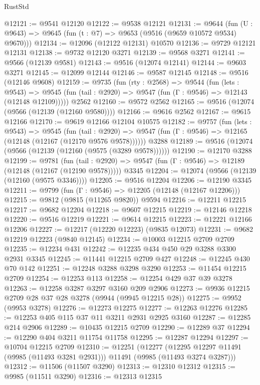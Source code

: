 \begin{lexlean}{RustStd}
\begin{coremodule}
@12121 := @9541 @12120
@12122 := @9538 @12121
@12131 := @9644
    (fun (U : @9643) => @9645 (fun (t : @7) => @9653 (@9516 (@9659 @10572 @9534) @9670)))
@12134 := @12096 (@12122 @12131) @10570
@12136 := @9729 @12121 @12131
@12138 := @9732 @12120 @3271
@12139 := @9568 @3271
@12141 := @9566 (@12139 @9581)
@12143 := @9516 (@12074 @12141)
@12144 := @9603 @3271
@12145 := @12099 @12144
@12146 := @9587 @12145
@12148 := @9516 (@12146 @9608)
@12159 := @9735
    (fun (rty : @2568) =>
    @9544
      (fun (lets : @9543) =>
      @9545 (fun (tail : @2920) => @9547 (fun (Γ : @9546) => @12143 (@12148 @12109)))))
    @2562
@12160 := @9572 @2562
@12165 := @9516 (@12074 (@9566 (@12139 (@12160 @9580))))
@12166 := @9616 @2562
@12167 := @9615 @12166
@12170 := @9619 @12166 @12104 @10575
@12182 := @9757
    (fun (lets : @9543) =>
    @9545
      (fun (tail : @2920) =>
      @9547 (fun (Γ : @9546) => @12165 (@12148 (@12167 (@12170 @9576 @9578))))))
    @3288
@12189 := @9516 (@12074 (@9566 (@12139 (@12160 (@9575 (@3289 @9578))))))
@12190 := @12170 @3288
@12199 := @9781
    (fun (tail : @2920) => @9547 (fun (Γ : @9546) => @12189 (@12148 (@12167 (@12190 @9578)))))
    @3345
@12204 := @12074 (@9566 (@12139 (@12160 (@9575 @3346))))
@12205 := @9516 @12204
@12206 := @12190 @3345
@12211 := @9799 (fun (Γ : @9546) => @12205 (@12148 (@12167 @12206)))
@12215 := @9812 (@9815 (@11265 @9820)) @9594
@12216 := @12211 @12215
@12217 := @9682 @12204
@12218 := @9607 @12215
@12219 := @12146 @12218
@12220 := @9516 @12219
@12221 := @9614 @12215
@12223 := @12221 @12166 @12206
@12227 := @12217 (@12220 @12223) (@9835 @12073)
@12231 := @9682 @12219 @12223 (@9840 @12145)
@12234 := @10003 @12215 @2709 @2709
@12235 := @12234 @431
@12242 := @12235 @434 @450 @29 @3288 @3300 @2931 @3345
@12245 := @11441 @12215 @2709 @427
@12248 := @12245 @430 @70 @142
@12251 := @12248 @3288 @3298 @3290
@12253 := @11454 @12215 @2709
@12254 := @12253 @113
@12258 := @12254 @429 @37 @39 @3278
@12263 := @12258 @3287 @3297 @3160 @209 @2906
@12273 := @9936 @12215 @2709 @28 @37 @28 @3278 (@9944 (@9945 @12215 @28))
@12275 := @9952 (@9953 @3278)
@12276 := @12273 @12275
@12277 := @12263 @12276
@12285 := @12253 @405 @115 @37 @11 @3211 @2931 @2925 @3160
@12287 := @12285 @214 @2906
@12289 := @10435 @12215 @2709
@12290 := @12289 @37
@12294 := @12290 @404 @3211 @11754 @11758
@12295 := @12287 @12294
@12297 := @10704 @12215 @2709
@12310 := @12251
    (@12277 (@12295 @12297 @11491 (@9985 (@11493 @3281 @2931))) @11491 (@9985 (@11493 @3274 @3287)))
@12312 := @11506 (@11507 @3290)
@12313 := @12310 @12312
@12315 := @9985 (@11511 @3290)
@12316 := @12313 @12315

\end{coremodule}
\end{lexlean}
